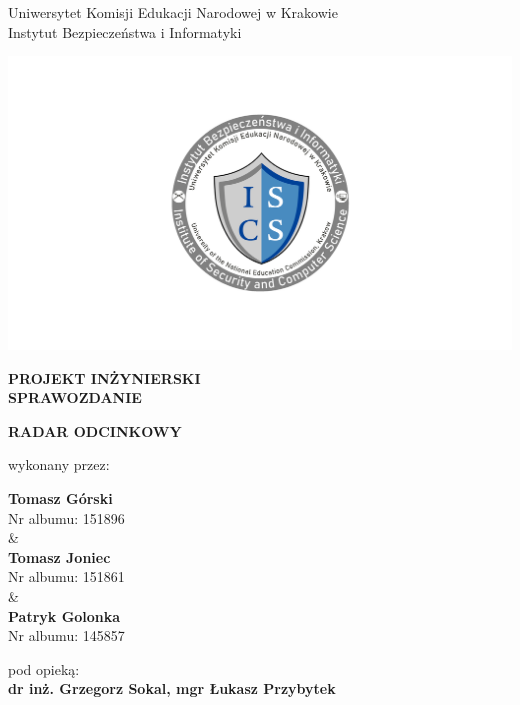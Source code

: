 \documentclass[12pt,a4paper,oneside]{article}
\theoremstyle{definition}
\numberwithin{equation}{section}
\begin{document}

\thispagestyle{empty}
\begin{titlepage}
\begin{center}\Large
Uniwersytet Komisji Edukacji Narodowej w Krakowie\\
\large
Instytut Bezpieczeństwa i Informatyki\\
\vskip 10pt
\end{center}
\begin{center}
\centering \includegraphics[width=1.0\columnwidth]{images/logo.png }
\end{center}

\begin{center}
 {\bf \fontsize{14pt}{14pt}\selectfont PROJEKT INŻYNIERSKI \\ SPRAWOZDANIE}
\end{center}
\vskip 5pt
\begin{center}
 {\bf \fontsize{22pt}{22pt}\selectfont RADAR ODCINKOWY}
\end{center}

\begin{center}
 {\fontsize{12pt}{12pt}\selectfont wykonany przez: }
\end{center}
\begin{center}
 {\bf\fontsize{16pt}{16pt}\selectfont Tomasz Górski}\\
 {\fontsize{12pt}{12pt}\selectfont Nr albumu: 151896 \\\&\\}
 {\bf\fontsize{16pt}{16pt}\selectfont Tomasz Joniec}\\
 {\fontsize{12pt}{12pt}\selectfont Nr albumu: 151861\\\&\\}
 {\bf\fontsize{16pt}{16pt}\selectfont Patryk Golonka}\\
 {\fontsize{12pt}{12pt}\selectfont Nr albumu: 145857}
\end{center}
\begin{center}
 {\fontsize{12pt}{12pt}\selectfont pod opieką:}\\
 {\bf\fontsize{12pt}{12pt}\selectfont dr inż. Grzegorz Sokal, mgr Łukasz Przybytek}
\end{center}


\end{titlepage}
\end{document}
